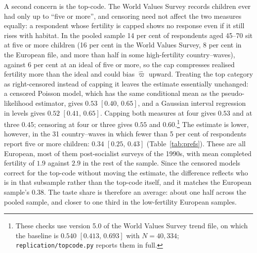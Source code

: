 \documentclass[11pt]{article}
\begin{document}
A second concern is the top-code. The World Values Survey records children ever had only up to
``five or more'', and censoring need not affect the two measures equally: a respondent whose
fertility is capped shows no response even if it still rises with habitat. In the pooled sample
14 per cent of respondents aged 45--70 sit at five or more children (16 per cent in the World Values Survey,
8 per cent in the European file, and more than half in some high-fertility country--waves), against
6 per cent at an ideal of five or more, so the cap compresses realised fertility more than the ideal
and could bias $\hat\varpi$ upward. Treating the top category as right-censored instead of capping
it leaves the estimate essentially unchanged: a censored Poisson model, which has the same
conditional mean as the pseudo-likelihood estimator, gives $0.53$ $[0.40,\,0.65]$, and a Gaussian
interval regression in levels gives $0.52$ $[0.41,\,0.65]$. Capping both measures at four gives
$0.53$ and at three $0.45$; censoring at four or three gives $0.55$ and $0.60$.\footnote{These
checks use version 5.0 of the World Values Survey trend file, on which the baseline is $0.540$ $[0.413,\,0.693]$ with
$N=40{,}334$; \texttt{replication/topcode.py} reports them in full.} The estimate is lower,
however, in the 31 country--waves in which fewer than 5 per cent of respondents report five or more
children: $0.34$ $[0.25,\,0.43]$ (Table~\ref{tab:prefs}). These are all European, most of them
post-socialist surveys of the 1990s, with mean completed fertility of $1.9$ against $2.9$ in the rest
of the sample. Since the censored models correct for the top-code without moving the estimate, the
difference reflects who is in that subsample rather than the top-code itself, and it matches the
European sample's $0.38$. The taste share is therefore an average: about one half across the pooled
sample, and closer to one third in the low-fertility European samples.
\end{document}
